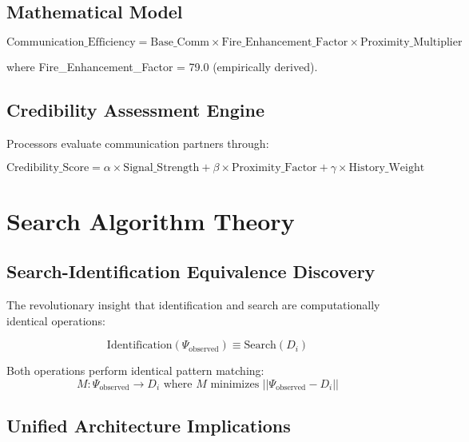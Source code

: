 \documentclass[12pt,a4paper]{article}
\begin{document}
\subsection{Mathematical Model}

\begin{equation}
\text{Communication\_Efficiency} = \text{Base\_Comm} \times \text{Fire\_Enhancement\_Factor} \times \text{Proximity\_Multiplier}
\end{equation}

where Fire\_Enhancement\_Factor = 79.0 (empirically derived).

\subsection{Credibility Assessment Engine}

Processors evaluate communication partners through:

\begin{equation}
\text{Credibility\_Score} = \alpha \times \text{Signal\_Strength} + \beta \times \text{Proximity\_Factor} + \gamma \times \text{History\_Weight}
\end{equation}

\section{Search Algorithm Theory}

\subsection{Search-Identification Equivalence Discovery}

The revolutionary insight that identification and search are computationally identical operations:

\begin{equation}
\text{Identification}(\Psi_{\text{observed}}) \equiv \text{Search}(D_i)
\end{equation}

Both operations perform identical pattern matching:
\begin{equation}
M: \Psi_{\text{observed}} \rightarrow D_i \text{ where } M \text{ minimizes } ||\Psi_{\text{observed}} - D_i||
\end{equation}

\subsection{Unified Architecture Implications}
\end{document}
